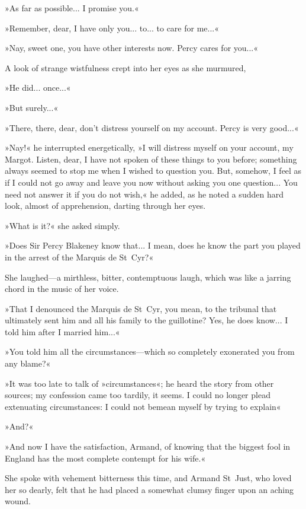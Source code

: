»As far as possible... I promise you.«

»Remember, dear, I have only you... to... to care for me...«

»Nay, sweet one, you have other interests now. Percy cares for you...«

A look of strange wistfulness crept into her eyes as she murmured,\longdash


»He did... once...«

»But surely...«

»There, there, dear, don't distress yourself on my account. Percy is very good...«

»Nay!« he interrupted energetically, »I will distress myself on your account, my Margot. Listen, dear, I have not spoken of these things to you before; something always seemed to stop me when I wished to question you. But, somehow, I feel as if I could not go away and leave you now without asking you one question... You need not answer it if you do not wish,« he added, as he noted a sudden hard look, almost of apprehension, darting through her eyes.

»What is it?« she asked simply.

»Does Sir Percy Blakeney know that... I mean, does he know the part you played in the arrest of the Marquis de St~Cyr?«

She laughed\allowbreak---\allowbreak a mirthless, bitter, contemptuous laugh, which was like a jarring chord in the music of her voice.

»That I denounced the Marquis de St~Cyr, you mean, to the tribunal that ultimately sent him and all his family to the guillotine? Yes, he does know... I told him after I married him...«

»You told him all the circumstances\allowbreak---\allowbreak which so completely exonerated you from any blame?«

»It was too late to talk of »circumstances«; he heard the story from other sources; my confession came too tardily, it seems. I could no longer plead extenuating circumstances: I could not bemean myself by trying to explain\longdash«

»And?«

»And now I have the satisfaction, Armand, of knowing that the biggest fool in England has the most complete contempt for his wife.«

She spoke with vehement bitterness this time, and Armand St~Just, who loved her so dearly, felt that he had placed a somewhat clumsy finger upon an aching wound.

